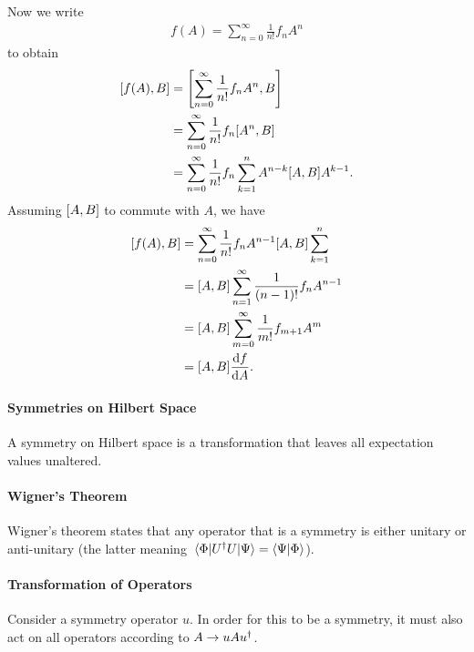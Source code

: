 Now we write
\begin{align*}
	f(A) = \sum\limits_{n = 0}^{\infty}\frac{1}{n!}f_{n}A^{n}
\end{align*}
to obtain
\begin{align*}
	\comm{f(A)}{B} &= \comm{\sum\limits_{n = 0}^{\infty}\frac{1}{n!}f_{n}A^{n}}{B} \\
	               &= \sum\limits_{n = 0}^{\infty}\frac{1}{n!}f_{n}\comm{A^{n}}{B} \\
	               &= \sum\limits_{n = 0}^{\infty}\frac{1}{n!}f_{n}\sum\limits_{k = 1}^{n}A^{n - k}\comm{A}{B}A^{k - 1}.
\end{align*}
Assuming $\comm{A}{B}$ to commute with $A$, we have
\begin{align*}
	\comm{f(A)}{B} &= \sum\limits_{n = 0}^{\infty}\frac{1}{n!}f_{n}A^{n - 1}\comm{A}{B}\sum\limits_{k = 1}^{n} \\
	               &= \comm{A}{B}\sum\limits_{n = 1}^{\infty}\frac{1}{(n - 1)!}f_{n}A^{n - 1} \\
	               &= \comm{A}{B}\sum\limits_{m = 0}^{\infty}\frac{1}{m!}f_{m + 1}A^{m} \\
	               &= \comm{A}{B}\dv{f}{A}.
\end{align*}

\paragraph{Symmetries on Hilbert Space}
A symmetry on Hilbert space is a transformation that leaves all expectation values unaltered.

\paragraph{Wigner's Theorem}
Wigner's theorem states that any operator that is a symmetry is either unitary or anti-unitary (the latter meaning $\mel{\Phi}{U^{\dagger}U}{\Psi} = \braket{\Psi}{\Phi}$).

\paragraph{Transformation of Operators}
Consider a symmetry operator $u$. In order for this to be a symmetry, it must also act on all operators according to $A\to uAu^{\dagger}$.

